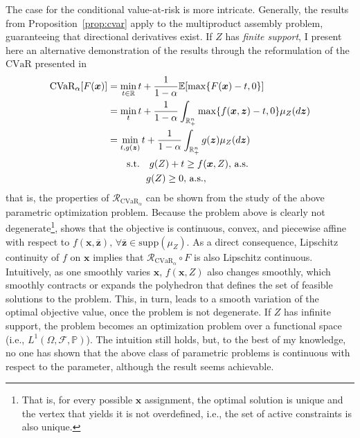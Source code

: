 \documentclass[12pt]{article}
\begin{document}
The case for the conditional value-at-risk is more intricate.
Generally, the results from Proposition~\ref{prop:cvar} apply to the multiproduct assembly problem, guaranteeing that directional derivatives exist.
If $Z$ has \emph{finite support}, I present here an alternative demonstration of the results through the reformulation of the $\text{CVaR}$ presented in \citet[Chapter~2.9]{birgeIntroductionStochasticProgramming2011}
\begin{align*}
    \text{CVaR}_\alpha[F(\bm{x})] &= \min_{t\in \mathbb{R}} t + \frac{1}{1-\alpha} \mathbb{E}[\max\{F(\bm{x})-t,0\}] \\
    &= \min_{t} t + \frac{1}{1-\alpha} \int_{\mathbb{R}^{n}_+} \max\{f(\bm{x},\bm{z})-t,0\} \mu_Z(d\bm{z}) \\
    &= \min_{t, g(\bm{z})} t + \frac{1}{1-\alpha} \int_{\mathbb{R}^{n}_+} g(\bm{z}) \mu_Z(d\bm{z}) \\
    &\quad\quad \text{s.t.} \quad g(Z) + t \ge f(\bm{x},Z),\, \text{a.s.} \\
    &\quad\quad \quad \quad g(Z) \ge 0,\, \text{a.s.}
,\end{align*}
that is, the properties of $\mathcal{R}_{\text{CVaR}_\alpha}$ can be shown from the study of the above parametric optimization problem.
Because the problem above is clearly not degenerate\footnote{That is, for every possible $\bm{x}$ assignment, the optimal solution is unique and the vertex that yields it is not overdefined, i.e., the set of active constraints is also unique.}, \citep[Theorem~2.1]{pistikopoulosMultiparametricOptimizationControl2021} shows that the objective is continuous, convex, and piecewise affine with respect to $f(\bm{x},\overline{\bm{z}}),\,\forall \overline{\bm{z}}\in \text{supp}(\mu_Z)$.
As a direct consequence, Lipschitz continuity of $f$ on $\bm{x}$ implies that $\mathcal{R}_{\text{CVaR}_\alpha} \circ F$ is also Lipschitz continuous.
Intuitively, as one smoothly varies $\bm{x}$, $f(\bm{x},Z)$ also changes smoothly, which smoothly contracts or expands the polyhedron that defines the set of feasible solutions to the problem.
This, in turn, leads to a smooth variation of the optimal objective value, once the problem is not degenerate.
If $Z$ has infinite support, the problem becomes an optimization problem over a functional space (i.e., $L^{1}(\Omega,\mathcal{F},\mathbb{P})$).
The intuition still holds, but, to the best of my knowledge, no one has shown that the above class of parametric problems is continuous with respect to the parameter, although the result seems achievable.
\end{document}
